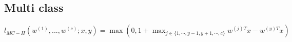 


\subsection*{Multi class}
$l_{MC-H}(w^{(1)},...,w^{(c)};x,y) =
\max (0,1+\max_{j\in\{1,\cdots,y-1,y+1,\cdots,c\}} w^{(j)T} x - w^{(y)T} x)$